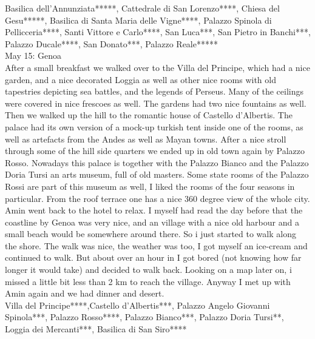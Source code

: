 Basilica dell'Annunziata*****, Cattedrale di San Lorenzo****, Chiesa del Gesu*****, Basilica di Santa Maria delle Vigne****, Palazzo Spinola di Pellicceria****, Santi Vittore e Carlo****,  San Luca***, San Pietro in Banchi***, Palazzo Ducale****, San Donato***, Palazzo Reale*****\\

May 15: Genoa\\
After a small breakfast we walked over to the Villa del Principe, which had a nice garden, and a nice decorated Loggia as well as other nice rooms with old tapestries depicting sea battles, and the legends of Perseus. Many of the ceilings were covered in nice frescoes as well. The gardens had two nice fountains as well. Then we walked up the hill to the romantic house of Castello d'Albertis. The palace had its own version of a mock-up turkish tent inside one of the rooms, as well as artefacts from the Andes as well as Mayan towns. After a nice stroll through some of the hill side quarters we ended up in old town again by Palazzo Rosso. Nowadays this palace is together with the Palazzo Bianco and the Palazzo Doria Tursi an arts museum, full of old masters. Some state rooms of the Palazzo Rossi are part of this museum as well, I liked the rooms of the four seasons in particular. From the roof terrace one has a nice 360 degree view of the whole city. Amin went back to the hotel to relax. I myself had read the day before that the coastline by Genoa was very nice, and an village with a nice old harbour and a small beach would be somewhere around there. So i just started to walk along the shore. The walk was nice, the weather was too, I got myself an ice-cream and continued to walk. But about over an hour in I got bored (not knowing how far longer it would take) and decided to walk back. Looking on a map later on, i missed a little bit less than 2 km to reach the village. Anyway I met up with Amin again and we had dinner and desert.\\

Villa del Principe****,Castello d'Albertis***, Palazzo Angelo Giovanni Spinola***, Palazzo Rosso****, Palazzo Bianco***, Palazzo Doria Tursi**, Loggia dei Mercanti***,  Basilica di San Siro****\\

